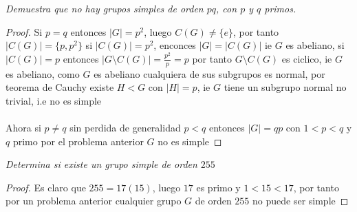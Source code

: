 \documentclass[11pt,letterpaper]{article}
\begin{document}
\begin{tcolorbox}[
	title = \textcolor{black}{\textcolor{white}{Problema 8}},]
\textit{Demuestra que no hay grupos simples de orden $pq$, con $p$ y $q$ primos.}
\end{tcolorbox}
\begin{proof}
    Si $p=q$ entonces $|G|=p^2$, luego $C(G)\neq\{e\}$, por tanto $|C(G)|=\{p,p^2\}$ si $|C(G)|=p^2$, enconces $|G|=|C(G)|$ ie $G$ es abeliano,  si $|C(G)|=p$ entonces $|G\setminus C(G)|=\frac{p^2}{p}=p$ por tanto $G\setminus C(G)$ es ciclico, ie $G$ es abeliano, como $G$ es abeliano cualquiera de sus subgrupos es normal, por teorema de Cauchy existe $H<G$ con $|H|=p$, ie $G$ tiene un subgrupo normal no trivial, i.e no es simple\,\\
    \,\\
    Ahora si $p\neq q$ sin perdida de generalidad $p<q$ entonces $|G|=qp$ con $1<p<q$ y $q$ primo por el problema anterior $G$ no es simple
\end{proof}
\begin{tcolorbox}[
	title = \textcolor{black}{\textcolor{white}{Problema 9}},]
\textit{Determina si existe un grupo simple de orden $255$}
\end{tcolorbox}
\begin{proof}
    Es claro que $255=17(15)$, luego $17$ es primo y $1<15<17$, por tanto por un problema anterior cualquier grupo $G$ de orden $255$ no puede ser simple
\end{proof}
\end{document}
